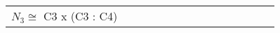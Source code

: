 \documentclass[varwidth=\maxdimen,border=10]{standalone}
\begin{document}
\begin{tabular}{@{}l@{}l@{}l@{}l@{}l@{}l@{}l@{}l@{}l@{}l@{}l@{}l@{}l@{}l@{}}
$N_3 %
\cong$ C3 x (C3 : C4)\ \\

\end{tabular}
\end{document}
